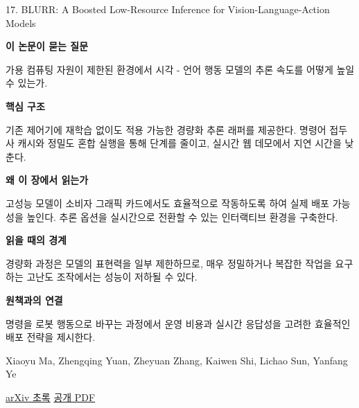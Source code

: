 \documentclass[11pt,openany]{book}
\begin{document}
\begin{termcard}{17. BLURR: A Boosted Low-Resource Inference for Vision-Language-Action Models}

\par

\medskip

{\sffamily\bfseries\color{deepblue} 이 논문이 묻는 질문}\par

가용 컴퓨팅 자원이 제한된 환경에서 시각 - 언어 행동 모델의 추론 속도를 어떻게 높일 수 있는가.

\smallskip

{\sffamily\bfseries\color{deepblue} 핵심 구조}\par

기존 제어기에 재학습 없이도 적용 가능한 경량화 추론 래퍼를 제공한다. 명령어 접두사 캐시와 정밀도 혼합 실행을 통해 단계를 줄이고, 실시간 웹 데모에서 지연 시간을 낮춘다.

\smallskip

{\sffamily\bfseries\color{deepblue} 왜 이 장에서 읽는가}\par

고성능 모델이 소비자 그래픽 카드에서도 효율적으로 작동하도록 하여 실제 배포 가능성을 높인다. 추론 옵션을 실시간으로 전환할 수 있는 인터랙티브 환경을 구축한다.

\smallskip

{\sffamily\bfseries\color{coral} 읽을 때의 경계}\par

경량화 과정은 모델의 표현력을 일부 제한하므로, 매우 정밀하거나 복잡한 작업을 요구하는 고난도 조작에서는 성능이 저하될 수 있다.

\smallskip

{\sffamily\bfseries\color{teal} 원책과의 연결}\par

명령을 로봇 행동으로 바꾸는 과정에서 운영 비용과 실시간 응답성을 고려한 효율적인 배포 전략을 제시한다.

\medskip

{\footnotesize\color{muted} Xiaoyu Ma, Zhengqing Yuan, Zheyuan Zhang, Kaiwen Shi, Lichao Sun, Yanfang Ye\par

\href{https://arxiv.org/abs/2512.11769}{arXiv 초록} \quad \href{https://arxiv.org/pdf/2512.11769}{공개 PDF}\par}

\end{termcard}
\end{document}
